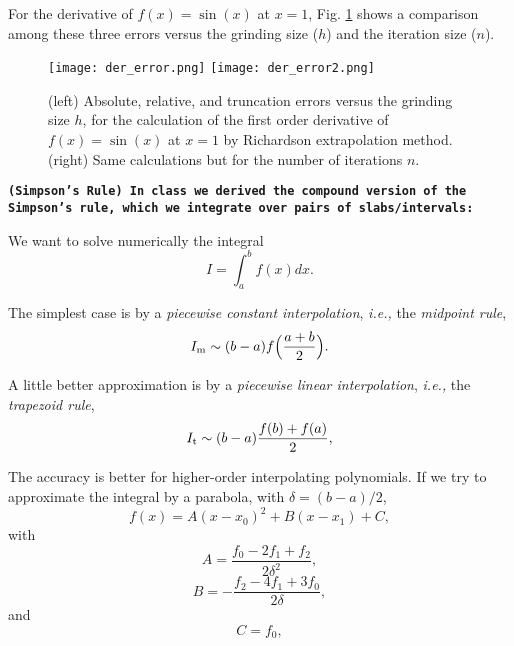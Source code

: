 \documentclass[11pt]{article}
\newcounter{question}[section]
\newcommand{\question}[2] {\vspace{.25in} \fbox{#1} #2 \vspace{.10in}}
\newcommand{\ie}{{\it i.e., }}
\begin{document}
\quad

For the derivative of $f(x)=\sin(x)$ at $x=1$, Fig. \ref{dev1} shows a comparison among these three errors versus the grinding size ($h$) and the iteration size ($n$).

\quad

\begin{figure} [ht]
\begin{center}
\texttt{[image: der\_error.png]} 
\texttt{[image: der\_error2.png]} 
\caption{(left) Absolute, relative, and truncation errors versus the grinding size $h$, for the calculation of the first order derivative of $f(x)=\sin(x)$ at $x=1$ by Richardson extrapolation method. (right) Same calculations but for the number of iterations $n$.}
\label{dev1}
\end{center}
\end{figure}

\quad

\clearpage



{\color{MidnightBlue}
\question{Q.3}{\texttt{{\bf(Simpson's Rule)} {\bf In class we derived the compound version of the Simpson's rule,  which we integrate over pairs of slabs/intervals:	}}}}

\quad

We want to solve numerically the integral
$$I = \int_a^b f(x) dx. $$

\quad

The simplest case is by a {\it piecewise constant interpolation}, \ie the {\it midpoint rule},
$$ I_{\rm m} \sim (b-a) f\Big(\frac{a+b}{2}\Big).$$

\quad

A little better approximation is by a {\it piecewise linear interpolation}, \ie the {\it trapezoid rule},
$$ I_{\rm t} \sim (b-a) \frac{f(b)+f(a)}{2},$$

\quad

The accuracy is better for higher-order interpolating polynomials. If we  try to  approximate the integral by a parabola, with $\delta = (b-a)/2$, 
\begin{equation}
f(x) = A(x-x_0)^2 + B(x-x_1)+C,
\label{parab}
\end{equation}
with
$$A = \frac{f_0 -2f_1+f_2}{2\delta^2}, $$
$$B = - \frac{f_2-4f_1+3f_0}{2 \delta}, $$
and
$$C = f_0,$$
\end{document}
